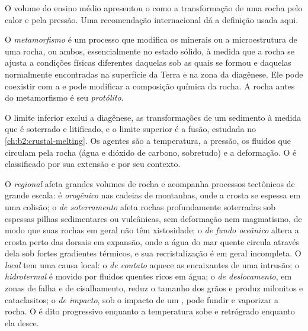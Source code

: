O volume do ensino médio apresentou o  como a transformação de uma rocha pelo calor e pela
pressão. Uma recomendação internacional dá a definição usada aqui.

\begin{definition}\label{def:b2:metamorphic-facies:metamorphism}
O \emph{metamorfismo} é um processo que modifica os minerais ou a
microestrutura de uma rocha, ou ambos, essencialmente no estado sólido, à medida que a rocha se ajusta
a condições físicas diferentes daquelas sob as quais se formou e daquelas
normalmente encontradas na superfície da Terra e na zona da diagênese. Ele pode coexistir com
a  e pode modificar a composição química da rocha. A rocha antes do
metamorfismo é seu \emph{protólito}.
\end{definition}

O limite inferior exclui a diagênese, as transformações de um sedimento à medida que é soterrado e
litificado, e o limite superior é a fusão, estudada no \cref{ch:b2:crustal-melting}. Os
agentes são a temperatura, a pressão, os fluidos que circulam pela rocha (água e
dióxido de carbono, sobretudo) e a deformação. O  é classificado por sua extensão e
por seu contexto.

O  \emph{regional} afeta grandes volumes de rocha e acompanha processos tectônicos
de grande escala: é \emph{orogênico} nas cadeias de montanhas, onde a crosta se espessa em uma
colisão; o  \emph{de soterramento} afeta rochas profundamente soterradas sob espessas
pilhas sedimentares ou vulcânicas, sem deformação nem magmatismo, de modo que suas rochas
em geral não têm xistosidade; o  \emph{de fundo oceânico} altera a crosta perto
das dorsais em expansão, onde a água do mar quente circula através dela sob fortes gradientes
térmicos, e sua recristalização é em geral incompleta. O  \emph{local}
tem uma causa local: o  \emph{de contato} aquece as encaixantes de uma intrusão;
o  \emph{hidrotermal} é movido por fluidos quentes ricos em água;
o  \emph{de deslocamento}, em zonas de falha e de cisalhamento, reduz o tamanho dos grãos e
produz milonitos e cataclasitos; o  \emph{de impacto}, sob o impacto de um ,
pode fundir e vaporizar a rocha. O  é dito progressivo enquanto a temperatura sobe e
retrógrado enquanto ela desce.

